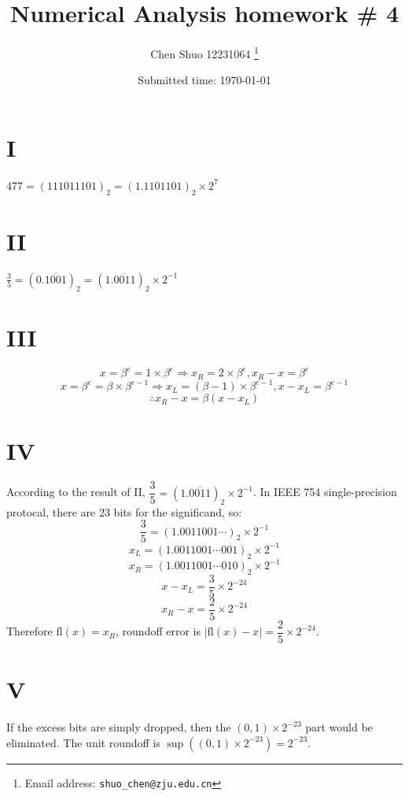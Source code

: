 \documentclass[a4paper]{article}
\begin{document}
\title{Numerical Analysis homework \# 4}

\author{Chen Shuo 12231064
  \thanks{Email address: \texttt{shuo\_chen@zju.edu.cn}}}


\date{Submitted time: \today}

\maketitle
\section*{I}
$477 = (111011101)_2=(1.1101101)_2\times 2^7$
\section*{II}
$\frac{3}{5} = (0.\overline{1001})_2 = (1.\overline{0011})_2\times 2^{-1}$
\section*{III}
$$
x = \beta^e = 1\times \beta^e \Longrightarrow x_R = 2\times \beta^e, x_R - x = \beta^e
$$
$$
x = \beta^e = \beta\times \beta^{e-1} \Longrightarrow x_L = (\beta-1)\times \beta^{e-1}, x - x_L = \beta^{e-1}
$$
$$
\therefore x_R - x = \beta(x - x_L)
$$
\section*{IV}
According to the result of II, $\dfrac{3}{5} = (1.\overline{0011})_2\times 2^{-1}$. In IEEE 754 single-precision protocal, 
there are 23 bits for the significand, so:
$$
\frac{3}{5} = (1.0011001\cdots)_2 \times 2^{-1}
$$
$$
x_L = (1.0011001\cdots001)_2 \times 2^{-1}
$$
$$
x_R = (1.0011001\cdots010)_2 \times 2^{-1}
$$
$$
x - x_L = \frac{3}{5} \times 2^{-24}
$$
$$
x_R - x = \frac{2}{5} \times 2^{-24}
$$
Therefore $\text{fl}(x) = x_R$, roundoff error is $|\text{fl}(x) - x| = \dfrac{2}{5} \times 2^{-24}$.

\section*{V}
If the excess bits are simply dropped, then the $(0,1)\times2^{-23}$ part would be eliminated. The unit roundoff is $\sup((0,1) \times 2^{-23}) = 2^{-23}$.
\end{document}
